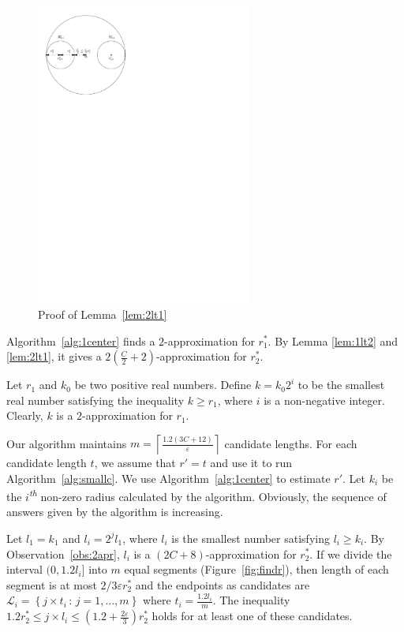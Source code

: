 \documentclass[envcountsame]{cls/cccg15}
\newcommand{\nth}{\textsuperscript{\textit{th}} }
\newcommand{\set}[1]{\left\{ #1 \right\}}
\newcommand{\ceil}[1]{\left\lceil{#1}\right\rceil}
\newcommand{\provided}{\,:\,}
\newcommand{\lee}{\leqslant}
\newcommand{\gee}{\geqslant}
\renewcommand{\le}{\lee}
\renewcommand{\ge}{\gee}
\newcommand{\eps}{\varepsilon}
\begin{document}
\begin{figure}[h]
	\centering
	\includegraphics[width=19em]{figs/2lt1}
	\caption{Proof of Lemma~\ref{lem:2lt1}}
	\label{fig:2lt1}
\end{figure}

Algorithm~\ref{alg:1center} finds a $2$-approximation for $r_1^*$. By Lemma \ref{lem:1lt2} and \ref{lem:2lt1}, it gives a $2\left(\frac{C}{2} + 2\right)$-approximation for $r_2^*$.

\begin{obs}
\label{obs:2apr}
Let $r_1$ and $k_0$ be two positive real numbers. Define $k=k_0 2^i$ to be the smallest real number satisfying the inequality $k \ge r_1$, where $i$ is a non-negative integer. Clearly, $k$ is a $2$-approximation for $r_1$.
\end{obs}


Our algorithm maintains $m=\ceil{\frac{1.2(3C+12)}{\eps}}$ candidate lengths.
For each candidate length $t$, we assume that $r' = t$ and use it to run Algorithm~\ref{alg:smallc}. We use Algorithm~\ref{alg:1center} to estimate $r'$. Let $k_i$ be the $i$\nth non-zero radius calculated by the algorithm. Obviously, the sequence of answers given by the algorithm is increasing.

Let $l_1=k_1$ and $l_i=2^j l_1$, where $l_i$ is the smallest number satisfying $l_i \ge k_i$. By Observation~\ref{obs:2apr}, $l_i$ is a $(2C + 8)$-approximation for $r_2^*$. If we divide the interval $(0, 1.2 l_i]$ into $m$ equal segments (Figure~\ref{fig:findr}), then length of each segment is at most $2/3 \eps r_2^*$ and the endpoints as candidates are $\mathcal{L}_i = \set{j \times t_i \provided j = 1, \dots, m}$ where $t_i = \frac{1.2 l_i}{m}$. 
The inequality $1.2 r_2^* \le j \times l_i \le (1.2 + \frac{2\eps}{3})r_2^*$ holds for at least one of these candidates.
\end{document}
